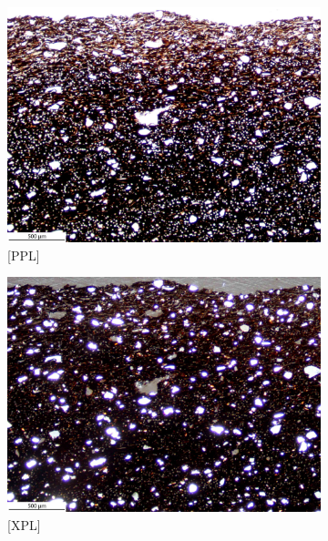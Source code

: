 \documentclass[a4paper]{article}
\begin{document}
\begin{figure}[H]
	\centering
	\begin{subfigure}[t]{.49\textwidth}
		\includegraphics[width=\textwidth]{ThinSections/103-1_4x_PPL.jpg}
		\caption{[PPL]}
	\end{subfigure}\hspace{.5em}\hfill
	\begin{subfigure}[t]{.49\textwidth}
		\includegraphics[width=\textwidth]{ThinSections/103-1_4x_XPL.jpg}
		\caption{[XPL]}
	\end{subfigure}
	\begin{subfigure}[t]{.49\textwidth}

\end{subfigure}
\end{figure}
\end{document}
